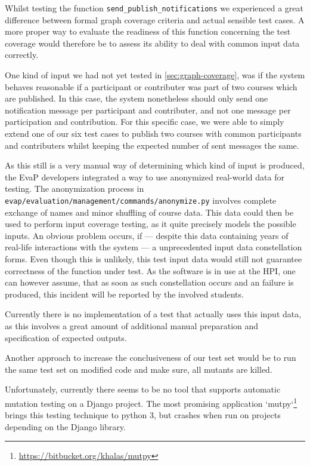 Whilst testing the function \texttt{send\_publish\_notifications} we experienced a great difference between formal graph coverage criteria and actual sensible test cases.
A more proper way to evaluate the readiness of this function concerning the test coverage would therefore be to assess its ability to deal with common input data correctly.

One kind of input we had not yet tested in \autoref{sec:graph-coverage}, was if the system behaves reasonable if a participant or contributer was part of two courses which are published.
In this case, the system nonetheless should only send one notification message per participant and contributer, and not one message per participation and contribution.
For this specific case, we were able to simply extend one of our six test cases to publish two courses with common participants and contributers whilst keeping the expected number of sent messages the same.

As this still is a very manual way of determining which kind of input is produced, the EvaP developers integrated a way to use anonymized real-world data for testing.
The anonymization process in \texttt{evap/evaluation/management/commands/anonymize.py} involves complete exchange of names and minor shuffling of course data.
This data could then be used to perform input coverage testing, as it quite precisely models the possible inputs.
An obvious problem occurs, if --- despite this data containing years of real-life interactions with the system --- a unprecedented input data constellation forms.
Even though this is unlikely, this test input data would still not guarantee correctness of the function under test.
As the software is in use at the HPI, one can however assume, that as soon as such constellation occurs and an failure is produced, this incident will be reported by the involved students.

Currently there is no implementation of a test that actually uses this input data, as this involves a great amount of additional manual preparation and specification of expected outputs.

Another approach to increase the conclusiveness of our test set would be to run the same test set on modified code and make sure, all mutants are killed.

Unfortunately, currently there seems to be no tool that supports automatic mutation testing on a Django project.
The most promising application `mutpy`\footnote{\url{https://bitbucket.org/khalas/mutpy}} brings this testing technique to python 3, but crashes when run on projects depending on the Django library.

